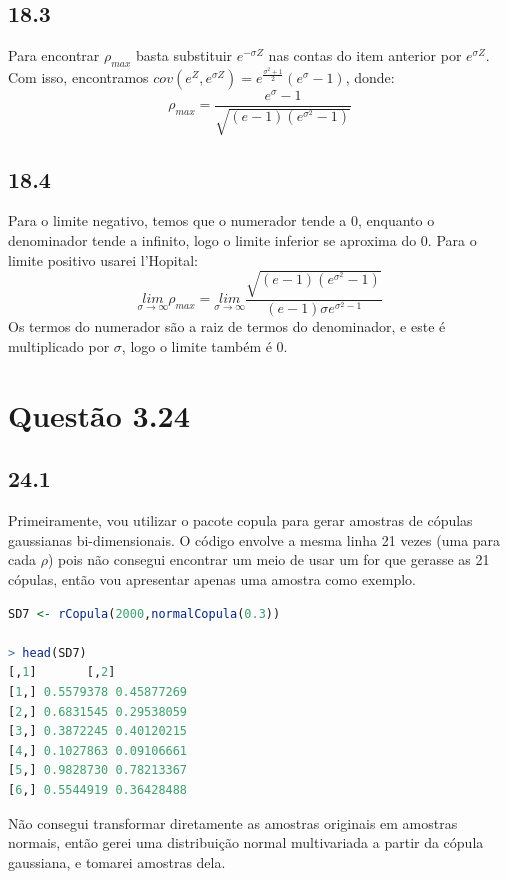 \documentclass[12pt]{article}
\begin{document}
\subsection*{18.3}
Para encontrar $\rho_{max}$ basta substituir $e^{-\sigma Z}$ nas contas do item anterior por $e^{\sigma Z}$. Com isso, encontramos $cov(e^Z,e^{\sigma Z})=e^{\frac{\sigma^2+1}{2}}(e^{\sigma}-1)$, donde:
\begin{equation*}
\rho_{max}=\frac{e^{\sigma}-1}
{\sqrt{(e-1)(e^{\sigma^2}-1)}}
\end{equation*}

\subsection*{18.4}
Para o limite negativo, temos que o numerador tende a 0, enquanto o denominador tende a infinito, logo o limite inferior se aproxima do 0. Para o limite positivo usarei l'Hopital:
\begin{equation*}
\underset{\sigma \rightarrow \infty}{lim}\rho_{max}=
\underset{\sigma \rightarrow \infty}{lim}
\frac{\sqrt{(e-1)(e^{\sigma^2}-1)}}{(e-1)\sigma e^{\sigma^2-1}}
\end{equation*}
Os termos do numerador são a raiz de termos do denominador, e este é multiplicado por $\sigma$, logo o limite também é 0.

\section*{Questão 3.24}

\subsection*{24.1}
Primeiramente, vou utilizar o pacote copula para gerar amostras de cópulas gaussianas bi-dimensionais. O código envolve a mesma linha 21 vezes (uma para cada $\rho$) pois não consegui encontrar um meio de usar um for que gerasse as 21 cópulas, então vou apresentar apenas uma amostra como exemplo.

\begin{lstlisting}[language=R]
SD7 <- rCopula(2000,normalCopula(0.3))

> head(SD7)
[,1]       [,2]
[1,] 0.5579378 0.45877269
[2,] 0.6831545 0.29538059
[3,] 0.3872245 0.40120215
[4,] 0.1027863 0.09106661
[5,] 0.9828730 0.78213367
[6,] 0.5544919 0.36428488
\end{lstlisting}

Não consegui transformar diretamente as amostras originais em amostras normais, então gerei uma distribuição normal multivariada a partir da cópula gaussiana, e tomarei amostras dela.
\end{document}
